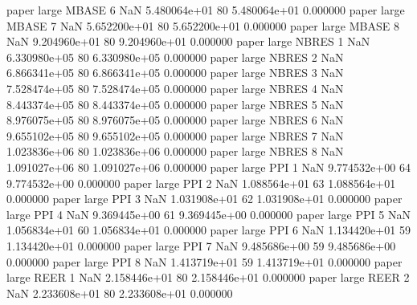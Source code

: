             paper      large    MBASE                 6                  NaN 5.480064e+01 80   5.480064e+01           0.000000
            paper      large    MBASE                 7                  NaN 5.652200e+01 80   5.652200e+01           0.000000
            paper      large    MBASE                 8                  NaN 9.204960e+01 80   9.204960e+01           0.000000
            paper      large    NBRES                 1                  NaN 6.330980e+05 80   6.330980e+05           0.000000
            paper      large    NBRES                 2                  NaN 6.866341e+05 80   6.866341e+05           0.000000
            paper      large    NBRES                 3                  NaN 7.528474e+05 80   7.528474e+05           0.000000
            paper      large    NBRES                 4                  NaN 8.443374e+05 80   8.443374e+05           0.000000
            paper      large    NBRES                 5                  NaN 8.976075e+05 80   8.976075e+05           0.000000
            paper      large    NBRES                 6                  NaN 9.655102e+05 80   9.655102e+05           0.000000
            paper      large    NBRES                 7                  NaN 1.023836e+06 80   1.023836e+06           0.000000
            paper      large    NBRES                 8                  NaN 1.091027e+06 80   1.091027e+06           0.000000
            paper      large      PPI                 1                  NaN 9.774532e+00 64   9.774532e+00           0.000000
            paper      large      PPI                 2                  NaN 1.088564e+01 63   1.088564e+01           0.000000
            paper      large      PPI                 3                  NaN 1.031908e+01 62   1.031908e+01           0.000000
            paper      large      PPI                 4                  NaN 9.369445e+00 61   9.369445e+00           0.000000
            paper      large      PPI                 5                  NaN 1.056834e+01 60   1.056834e+01           0.000000
            paper      large      PPI                 6                  NaN 1.134420e+01 59   1.134420e+01           0.000000
            paper      large      PPI                 7                  NaN 9.485686e+00 59   9.485686e+00           0.000000
            paper      large      PPI                 8                  NaN 1.413719e+01 59   1.413719e+01           0.000000
            paper      large     REER                 1                  NaN 2.158446e+01 80   2.158446e+01           0.000000
            paper      large     REER                 2                  NaN 2.233608e+01 80   2.233608e+01           0.000000
